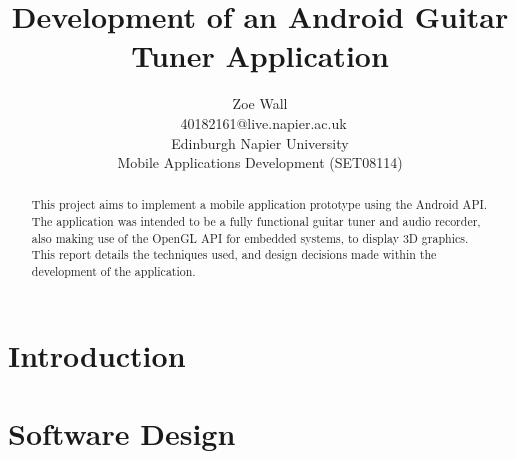 \documentclass[conference]{acmsiggraph}
\title{Development of an Android Guitar Tuner Application}
\author{Zoe Wall \\\ 40182161@live.napier.ac.uk \\
Edinburgh Napier University \\
Mobile Applications Development (SET08114)}
\newcommand{\figuremacroW}[4]{
	\begin{figure}[h] %
		\centering
		\texttt{[image: \#1]}
		\caption[#2]{\textbf{#2} - #3}
		\label{fig:#1}
	\end{figure}
}
\begin{document}

\maketitle

\begin{abstract} %
This project aims to implement a mobile application prototype using the Android API. The application was intended to be a fully functional guitar tuner and audio recorder, also making use of the OpenGL API for embedded systems, to display 3D graphics. This report details the techniques used, and design decisions made within the development of the application.
\end{abstract}

\keywordlist




\section{Introduction}




\section{Software Design}

 
\end{document}
